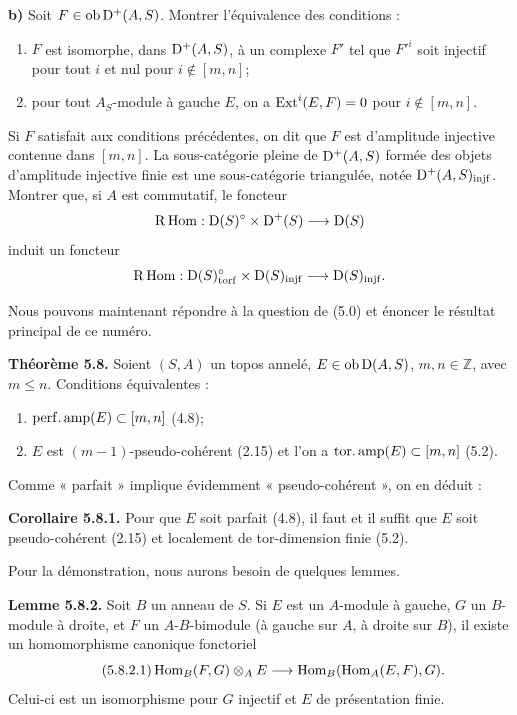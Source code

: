 \documentclass[11pt]{article}
\begin{document}
\textbf{b)} Soit \(F\in\operatorname{ob}\mathrm D^+(A,S)\). Montrer l'équivalence des conditions :
\begin{enumerate}[label=(\roman*)]
\item \(F\) est isomorphe, dans \(\mathrm D^+(A,S)\), à un complexe \(F'\) tel que \(F'^i\) soit injectif pour tout \(i\) et nul pour \(i\notin[m,n]\);
\item pour tout \(A_S\)-module à gauche \(E\), on a \(\operatorname{Ext}^i(E,F)=0\) pour \(i\notin[m,n]\).
\end{enumerate}
Si \(F\) satisfait aux conditions précédentes, on dit que \(F\) est d'amplitude injective contenue dans \([m,n]\). La sous-catégorie pleine de \(\mathrm D^+(A,S)\) formée des objets d'amplitude injective finie est une sous-catégorie triangulée, notée \(\mathrm D^+(A,S)_{\operatorname{injf}}\). Montrer que, si \(A\) est commutatif, le foncteur
\[
  \mathrm R\operatorname{Hom}:\mathrm D(S)^\circ\times\mathrm D^+(S)\longrightarrow \mathrm D(S)
\]
induit un foncteur
\[
  \mathrm R\operatorname{Hom}:\mathrm D(S)^\circ_{\operatorname{torf}}\times\mathrm D(S)_{\operatorname{injf}}
  \longrightarrow \mathrm D(S)_{\operatorname{injf}}.
\]

Nous pouvons maintenant répondre à la question de (5.0) et énoncer le résultat principal de ce numéro.

\textbf{Théorème 5.8.} Soient \((S,A)\) un topos annelé, \(E\in\operatorname{ob}\mathrm D(A,S)\), \(m,n\in\mathbb Z\), avec \(m\leq n\). Conditions équivalentes :
\begin{enumerate}[label=(\roman*)]
\item \(\operatorname{perf.amp}(E)\subset[m,n]\) (4.8);
\item \(E\) est \((m-1)\)-pseudo-cohérent (2.15) et l'on a \(\operatorname{tor.amp}(E)\subset[m,n]\) (5.2).
\end{enumerate}
Comme « parfait » implique évidemment « pseudo-cohérent », on en déduit :

\textbf{Corollaire 5.8.1.} Pour que \(E\) soit parfait (4.8), il faut et il suffit que \(E\) soit pseudo-cohérent (2.15) et localement de tor-dimension finie (5.2).

Pour la démonstration, nous aurons besoin de quelques lemmes.

\textbf{Lemme 5.8.2.} Soit \(B\) un anneau de \(S\). Si \(E\) est un \(A\)-module à gauche, \(G\) un \(B\)-module à droite, et \(F\) un \(A\)-\(B\)-bimodule (à gauche sur \(A\), à droite sur \(B\)), il existe un homomorphisme canonique fonctoriel
\begin{equation}\tag{5.8.2.1}
  \operatorname{Hom}_B(F,G)\otimes_A E
  \longrightarrow
  \operatorname{Hom}_B(\operatorname{Hom}_A(E,F),G).
\end{equation}
Celui-ci est un isomorphisme pour \(G\) injectif et \(E\) de présentation finie.
\end{document}
